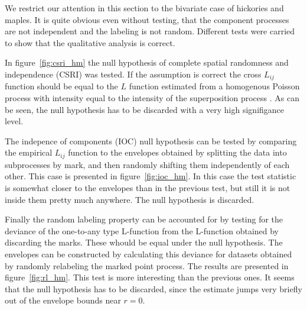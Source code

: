 \documentclass[12pt,a4paper,oneside,article]{memoir}
\begin{document}
We restrict our attention in this section to the bivariate case of hickories
and maples. It is quite obvious even without testing, that the
component processes are not independent and the labeling is not random.
Different tests were carried to show that the qualitative analysis is correct.

In figure~\ref{fig:csri_hm} the null hypothesis of complete spatial randomness
and independence (CSRI) was tested. If the assumption is correct the cross $L_{ij}$ function 
should be equal to the $L$ function estimated from a homogenous Poisson process
with intensity equal to the intensity of the superposition process \cite{gelfand}.
As can be seen, the null hypothesis has to be discarded with a very high signifigance level.

The indepence of components (IOC) null hypothesis can be tested by comparing the empirical
$L_{ij}$ function to the envelopes obtained by splitting the data into subprocesses by mark,
and then randomly shifting them independently of each other. This case is presented
in figure~\ref{fig:ioc_hm}. In this case the test statistic is somewhat closer to the
envelopes than in the previous test, but still it is not inside them pretty much anywhere.
The null hypothesis is discarded.

Finally the random labeling property can be accounted for by testing for the deviance
of the one-to-any type L-function from the L-function obtained by discarding the marks.
These whould be equal under the null hypothesis. The envelopes can be constructed
by calculating this deviance for datasets obtained by randomly relabeling
the marked point process. The results are presented in figure~\ref{fig:rl_hm}.
This test is more interesting than the previous ones. It seems that the
null hypothesis has to be discarded, since the estimate jumps very briefly out of the
envelope bounds near $r=0$.
\end{document}
